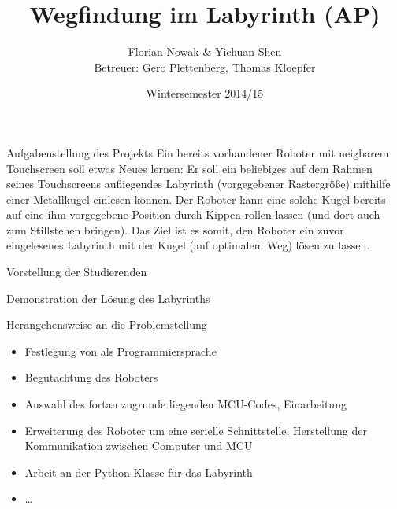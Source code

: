 \documentclass{beamer}
\title{Wegfindung im Labyrinth (AP)}
\author{\texorpdfstring{Florian Nowak \& Yichuan Shen\\ Betreuer: Gero Plettenberg, Thomas Kloepfer}{Florian Nowak \& Yichuan Shen}}
\date{Wintersemester 2014/15}
\begin{document}
\maketitle

\begin{frame}[fragile,t]{Aufgabenstellung des Projekts}
Ein bereits vorhandener Roboter mit neigbarem Touchscreen soll etwas Neues lernen: Er soll ein beliebiges auf dem Rahmen seines Touchscreens aufliegendes Labyrinth (vorgegebener Rastergröße) mithilfe einer Metallkugel einlesen können. Der Roboter kann eine solche Kugel bereits auf eine ihm vorgegebene Position durch Kippen rollen lassen (und dort auch zum Stillstehen bringen). Das Ziel ist es somit, den Roboter ein zuvor eingelesenes Labyrinth mit der Kugel (auf optimalem Weg) lösen zu lassen.

\medskip\noindent
{}
\end{frame}

\begin{frame}[fragile,t]{Vorstellung der Studierenden}
\end{frame}

\begin{frame}[fragile,t]{Demonstration der Lösung des Labyrinths}
\end{frame}

\begin{frame}[fragile,t]{Herangehensweise an die Problemstellung}
\begin{itemize}
\item Festlegung von  als Programmiersprache
\item Begutachtung des Roboters
\item Auswahl des fortan zugrunde liegenden MCU-Codes, Einarbeitung
\item Erweiterung des Roboter um eine serielle Schnittstelle, Herstellung der Kommunikation zwischen Computer und MCU
\item Arbeit an der Python-Klasse für das Labyrinth
\item \ldots
\end{itemize}
\end{frame}
\end{document}
